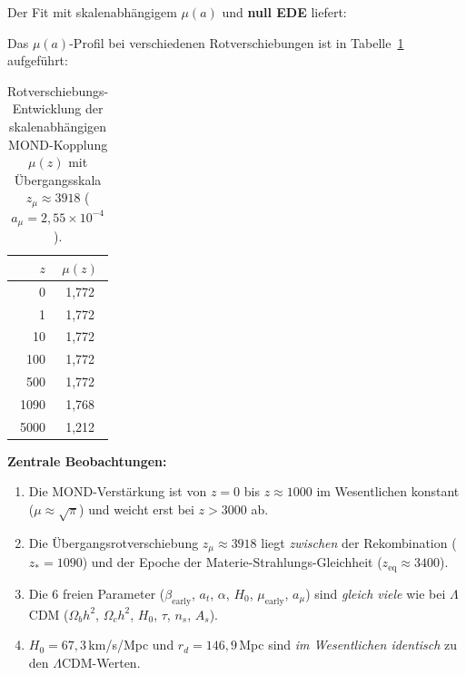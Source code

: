 \documentclass[aps,prd,twocolumn,superscriptaddress,nofootinbib,floatfix]{revtex4-2}
\begin{document}
Der Fit mit skalenabhängigem $\mu(a)$ und \textbf{null EDE} liefert:
\begin{center}
\end{center}

Das $\mu(a)$-Profil bei verschiedenen Rotverschiebungen ist in Tabelle~\ref{tab:mu_redshift} aufgeführt:

\begin{table}[t]
\centering
\caption{Rotverschiebungs-Entwicklung der skalenabhängigen MOND-Kopplung $\mu(z)$ mit Übergangsskala $z_\mu \approx 3918$ ($a_\mu = 2{,}55 \times 10^{-4}$).}
\label{tab:mu_redshift}
\begin{tabular}{rc}
\toprule
$z$ & $\mu(z)$ \\
\midrule
0 & 1{,}772 \\
1 & 1{,}772 \\
10 & 1{,}772 \\
100 & 1{,}772 \\
500 & 1{,}772 \\
1090 & 1{,}768 \\
5000 & 1{,}212 \\
\bottomrule
\end{tabular}
\end{table}


\textbf{Zentrale Beobachtungen:}
\begin{enumerate}
\item Die MOND-Verstärkung ist von $z = 0$ bis $z \approx 1000$ im Wesentlichen konstant ($\mu \approx \sqrt{\pi}$) und weicht erst bei $z > 3000$ ab.
\item Die Übergangsrotverschiebung $z_\mu \approx 3918$ liegt \textit{zwischen} der Rekombination ($z_* = 1090$) und der Epoche der Materie-Strahlungs-Gleichheit ($z_{\mathrm{eq}} \approx 3400$).
\item Die 6 freien Parameter ($\beta_{\mathrm{early}}$, $a_t$, $\alpha$, $H_0$, $\mu_{\mathrm{early}}$, $a_\mu$) sind \textit{gleich viele} wie bei $\Lambda$CDM ($\Omega_b h^2$, $\Omega_c h^2$, $H_0$, $\tau$, $n_s$, $A_s$).
\item $H_0 = 67{,}3$\,km/s/Mpc und $r_d = 146{,}9$\,Mpc sind \textit{im Wesentlichen identisch} zu den $\Lambda$CDM-Werten.
\end{enumerate}
\end{document}
